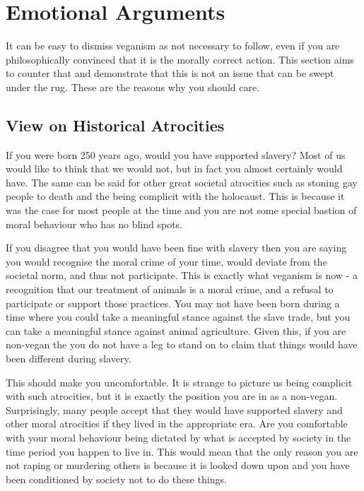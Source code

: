 
\section{Emotional Arguments}
\label{sec:EmotionalArguments}

It can be easy to dismiss veganism as not necessary to follow, even if you are philosophically convinced that it is the morally correct action. This section aims to counter that and demonstrate that this is not an issue that can be swept under the rug. These are the reasons why you should care.

\subsection{View on Historical Atrocities}

If you were born 250 years ago, would you have supported slavery? Most of us would like to think that we would not, but in fact you almost certainly would have. The same can be said for other great societal atrocities such as stoning gay people to death and the being complicit with the holocaust. This is because it was the case for most people at the time and you are not some special bastion of moral behaviour who has no blind spots.

If you disagree that you would have been fine with slavery then you are saying you would recognise the moral crime of your time, would deviate from the societal norm, and thus not participate. This is exactly what veganism is now - a recognition that our treatment of animals is a moral crime, and a refusal to participate or support those practices. You may not have been born during a time where you could take a meaningful stance against the slave trade, but you can take a meaningful stance against animal agriculture. Given this, if you are non-vegan the you do not have a leg to stand on to claim that things would have been different during slavery.

This should make you uncomfortable. It is strange to picture us being complicit with such atrocities, but it is exactly the position you are in as a non-vegan. Surprisingly, many people accept that they would have supported slavery and other moral atrocities if they lived in the appropriate era. Are you comfortable with your moral behaviour being dictated by what is accepted by society in the time period you happen to live in. This would mean that the only reason you are not raping or murdering others is because it is looked down upon and you have been conditioned by society not to do these things.

